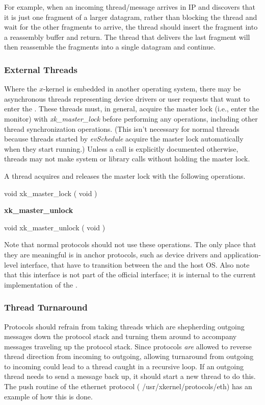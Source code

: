 For example, when an incoming thread/message arrives in IP and
discovers that it is just one fragment of a larger datagram, rather
than blocking the thread and wait for the other fragments to arrive,
the thread should insert the fragment into a reassembly buffer and
return. The thread that delivers the last fragment will then
reassemble the fragments into a single datagram and continue.

\subsubsection{External Threads}
\label{ext-threads}

Where the $x$-kernel is embedded in another operating system, there
may be asynchronous threads representing device drivers or user
requests that want to enter the \xk{}.  These threads must, in
general, acquire the \xk{} master lock (i.e., enter the \xk{} monitor)
with {\em xk\_master\_lock} before performing any \xk{} operations,
including other thread synchronization operations.  (This isn't
necessary for normal \xk{} threads because threads started by {\em
evSchedule} acquire the master lock automatically when they start
running.)  Unless a call is explicitly documented otherwise, threads
may not make \xk{} system or library calls without holding the master
lock.

A thread acquires and releases the master \xk{} lock with the following
operations.
\medskip

{\sem void} {\bold xk\_master\_lock} ( {\sem void} )

\bigskip
\noindent
{\bf xk\_master\_unlock}
\smallskip

\medskip

{\sem void} {\bold xk\_master\_unlock} ( {\sem void} )

\bigskip

Note that normal protocols should not use these operations. The only
place that they are meaningful is in anchor protocols, such as device
drivers and application-level interface, that have to transition
between the \xk{} and the host OS. Also note that this interface is
not part of the official \xk{} interface; it is internal to the
current implementation of the \xk{}.

\subsubsection{Thread Turnaround}

Protocols should refrain from taking threads which are shepherding
outgoing messages down the protocol stack and turning them around to
accompany messages traveling up the protocol stack.  Since protocols
{\em are} allowed to reverse thread direction from incoming to
outgoing, allowing turnaround from outgoing to incoming could lead to
a thread caught in a recursive loop.  If an outgoing thread needs to
send a message back up, it should start a new thread to do this.  The
push routine of the ethernet protocol ({\sanss
/usr/xkernel/protocols/eth}) has an example of how this is done.

